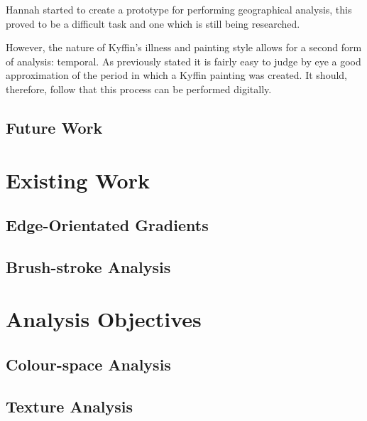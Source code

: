 Hannah started to create a prototype for performing geographical analysis, this proved to be a 
difficult task and one which is still being researched.

However, the nature of Kyffin's illness and painting style allows for a second form of analysis:
temporal. As previously stated it is fairly easy to judge by eye a good approximation of the 
period in which a Kyffin painting was created. It should, therefore, follow that this process can
be performed digitally.




\subsection{Future Work}



\section{Existing Work}


\subsection{Edge-Orientated Gradients}


\subsection{Brush-stroke Analysis}



\section{Analysis Objectives}

\subsection{Colour-space Analysis}

\subsection{Texture Analysis}

